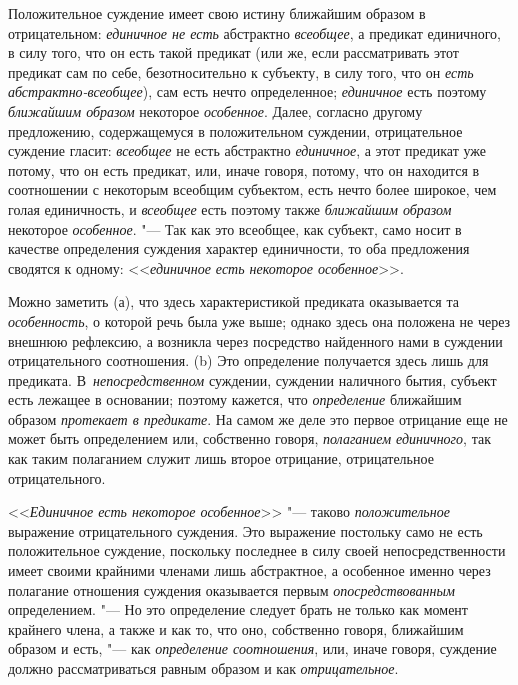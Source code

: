 Положительное суждение имеет свою истину ближайшим образом в отрицательном:
{\em единичное не есть} абстрактно {\em всеобщее}, а предикат единичного, в
силу того, что он есть такой предикат (или же, если рассматривать этот предикат
сам по себе, безотносительно к субъекту, в силу того, что он
{\em есть абстрактно-всеобщее}), сам есть нечто определенное; {\em единичное}
есть поэтому {\em ближайшим образом} некоторое {\em особенное}. Далее, согласно
другому предложению, содержащемуся в положительном суждении, отрицательное
суждение гласит: {\em всеобщее} не есть абстрактно {\em единичное}, а этот
предикат уже потому, что он есть предикат, или, иначе говоря, потому, что он
находится в соотношении с некоторым всеобщим субъектом, есть нечто более
широкое, чем голая единичность, и {\em всеобщее} есть поэтому также
{\em ближайшим образом} некоторое {\em особенное}. "--- Так как это всеобщее,
как субъект, само носит в качестве определения суждения характер единичности,
то оба предложения сводятся к одному:
<<{\em единичное есть некоторое особенное}>>.

Можно заметить (а), что здесь характеристикой предиката оказывается та
{\em особенность}, о которой речь была уже выше; однако здесь она положена не через
внешнюю рефлексию, а возникла через посредство найденного нами в суждении
отрицательного соотношения. (b) Это определение получается здесь лишь для
предиката. В~{\em непосредственном} суждении, суждении наличного бытия,
субъект есть лежащее в основании; поэтому кажется, что {\em определение}
ближайшим образом {\em протекает в предикате}. На самом же деле это первое
отрицание еще не может быть определением или, собственно говоря,
{\em полаганием единичного}, так как таким полаганием служит лишь второе
отрицание, отрицательное отрицательного.

<<{\em Единичное есть некоторое особенное}>> "--- таково {\em положительное}
выражение отрицательного суждения. Это выражение постольку само не есть
положительное суждение, поскольку последнее в силу своей непосредственности
имеет своими крайними членами лишь абстрактное, а особенное именно через
полагание отношения суждения оказывается первым {\em опосредствованным}
определением. "--- Но это определение следует брать не только как момент
крайнего члена, а также и как то, что оно, собственно говоря, ближайшим образом
и есть, "--- как {\em определение соотношения}, или, иначе говоря, суждение
должно рассматриваться равным образом и как {\em отрицательное}.

